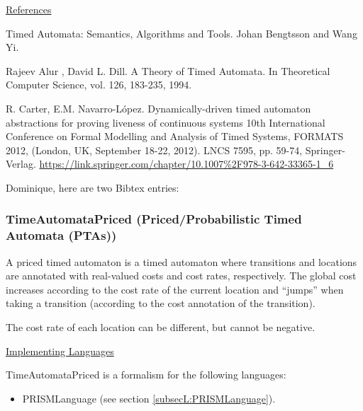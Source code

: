 \underline{References}

Timed Automata: Semantics, Algorithms and Tools.
Johan Bengtsson and Wang Yi.

Rajeev Alur , David L. Dill.  
A Theory of Timed Automata. 
In Theoretical Computer Science, vol. 126, 183-235, 1994.

R. Carter, E.M. Navarro-L\'opez.
Dynamically-driven timed automaton abstractions for proving liveness of continuous systems
10th International Conference on Formal Modelling and Analysis of Timed Systems, FORMATS 2012, (London, UK, September 18-22, 2012). LNCS 7595, pp. 59-74, Springer-Verlag.
\url{https://link.springer.com/chapter/10.1007%2F978-3-642-33365-1_6}


Dominique, here are two  Bibtex entries:






\subsubsection{TimeAutomataPriced (Priced/Probabilistic Timed Automata (PTAs))}
\label{subsubsecF:TimeAutomataPriced}


A priced timed automaton is a timed automaton where transitions and locations are annotated with real-valued costs and cost rates, respectively. The global cost increases according to the cost rate of the current location and ``jumps'' when taking a transition (according to the cost annotation of the transition).

The cost rate of each location can be different, but cannot be negative.

\underline{Implementing Languages}

TimeAutomataPriced is a formalism for the following languages:
\begin{itemize}
	\item PRISMLanguage (see section \ref{subsecL:PRISMLanguage}).
\end{itemize}


